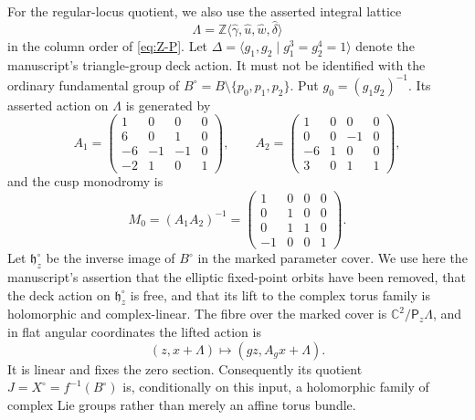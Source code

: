 \documentclass[11pt]{article}
\numberwithin{equation}{section}
\theoremstyle{definition}
\theoremstyle{remark}
\newcommand{\C}{\mathbb C}
\newcommand{\Z}{\mathbb Z}
\begin{document}
For the regular-locus quotient, we also use the asserted integral lattice
\begin{equation}\label{eq:monodromy-lattice}
 \Lambda=\Z\langle\widehat\gamma,\widehat u,
                    \widehat w,\widehat\delta\rangle
\end{equation}
in the column order of \eqref{eq:Z-P}.  Let
$\Delta=\langle g_1,g_2\mid g_1^3=g_2^4=1\rangle$ denote the manuscript's
triangle-group deck action.  It must not be identified with the ordinary
fundamental group of
$B^\circ=B\setminus\{p_0,p_1,p_2\}$.  Put $g_0=(g_1g_2)^{-1}$.  Its asserted
action on $\Lambda$ is
generated by
\begin{equation}\label{eq:monodromy-matrices}
 A_1=
 \begin{pmatrix}
 1&0&0&0\\6&0&1&0\\-6&-1&-1&0\\-2&1&0&1
 \end{pmatrix},\qquad
 A_2=
 \begin{pmatrix}
 1&0&0&0\\0&0&-1&0\\-6&1&0&0\\3&0&1&1
 \end{pmatrix},
\end{equation}
and the cusp monodromy is
\begin{equation}\label{eq:cusp-monodromy-matrix}
 M_0=(A_1A_2)^{-1}=
 \begin{pmatrix}
 1&0&0&0\\0&1&0&0\\0&1&1&0\\-1&0&0&1
 \end{pmatrix}.
\end{equation}
Let $\mathfrak h_z^\circ$ be the inverse image of $B^\circ$ in the marked
parameter cover.  We use here the manuscript's assertion that the elliptic
fixed-point orbits have been removed, that the deck action on
$\mathfrak h_z^\circ$ is free, and that its lift to the complex torus family
is holomorphic and complex-linear.  The fibre over the marked cover is
$\C^2/\mathsf P_z\Lambda$, and in flat angular coordinates the lifted action
is
\begin{equation}\label{eq:flat-monodromy-action}
 (z,x+\Lambda)\longmapsto(gz,A_gx+\Lambda).
\end{equation}
It is linear and fixes the zero section.  Consequently its quotient
$J=X^\circ=f^{-1}(B^\circ)$ is, conditionally on this input, a holomorphic
family of complex Lie groups rather than merely an affine torus bundle.
\end{document}
